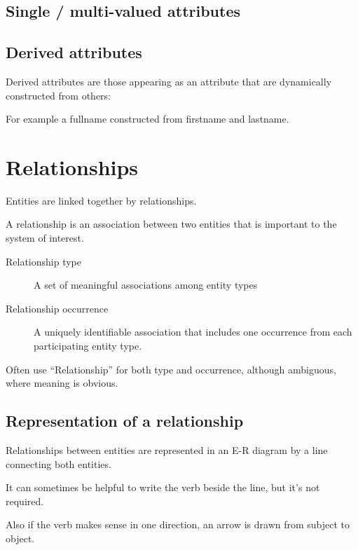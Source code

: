 \documentclass[slides]{pgnotes}
\begin{document}
\subsection{Single / multi-valued attributes}
\label{single-multi-valued-attributes}



\subsection{Derived attributes}
\label{derived-attributes}

Derived attributes are those appearing as an attribute that are dynamically constructed from others:

For example a fullname constructed from firstname and lastname.


\section{Relationships}
\label{relationships}

Entities are linked together by relationships.

A relationship is an association between two entities that is important to the system of interest. 

\begin{description}
\item[Relationship type]
A set of meaningful associations among entity types
\item[Relationship occurrence]
A uniquely identifiable association that includes one occurrence from each participating entity type.
\end{description}

Often use ``Relationship'' for both type and occurrence, although
ambiguous, where meaning is obvious.

\subsection{Representation of a relationship}
\label{representation-of-a-relationship}

Relationships between entities are represented in an E-R diagram by a
line connecting both entities.

It can sometimes be helpful to write the verb beside the line, but it's not required.

Also if the verb makes sense in one direction, an arrow is drawn from subject to object.

\newpage 
\end{document}
